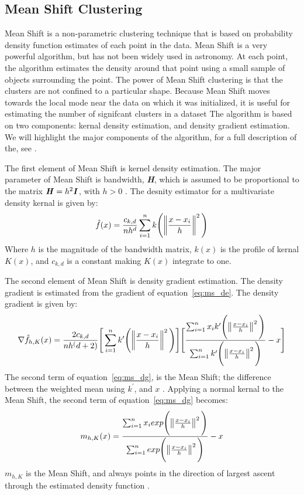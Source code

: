 \subsection{Mean Shift Clustering} 
Mean Shift is a non-parametric clustering technique that is based on probability density function estimates of each point in the data. %
Mean Shift is a very powerful algorithm, but has not been widely used in astronomy. %
At each point, the algorithm estimates the density around that point using a small sample of objects surrounding the point.
The power of Mean Shift clustering is that the clusters are not confined to a particular shape.
Because Mean Shift moves towards the local mode near the data on which it was initialized, it is useful for estimating the number of signifcant clusters in a dataset \citet{comanciciu02}
The algorithm is based on two components: kernal density estimation, and density gradient estimation.
We will highlight the major components of the algorithm, for a full description of the, see \citet{vatturi09}.

The first element of Mean Shift is kernel density estimation. 
The major parameter of Mean Shift is bandwidth, \textbf{\textit{H}}, which is assumed to be proportional to the matrix $\textbf{\textit{H}} = h^2\textbf{\textit{I}}$, with $h>0$ \citet{vatturi09}.
The desnity estimator for a multivariate density kernal is given by: 
\begin{equation} 
\label{eq:ms_de}
\hat{f}(x) = \frac{c_{k,d}}{nh^d} \sum_{i=1}^n k\Bigg( \norm{\frac{x-x_{i}}{h}}^2 \Bigg)
\end{equation}
Where $h$ is the magnitude of the bandwidth matrix, $k(x)$ is the profile of kernal $K(x)$, and $c_{k,d}$ is a constant making $K(x)$ integrate to one\citet{vatturi09}.

The second element of Mean Shift is density gradient estimation. 
The density gradient is estimated from the gradient of equation~\ref{eq:ms_de}\citet{vatturi09}.
The density gradient is given by: 
\begin{equation}
\label{eq:ms_dg}
\nabla\hat{f}_{h,K}(x) = \frac{2c_{k,d}}{nh^(d+2)} \Bigg[ \sum_{i=1}^n k^{\prime} \Bigg( \norm{\frac{x-x_{i}}{h}}^2 \Bigg) \Bigg] \Bigg[\frac{\sum_{i=1}^n x_{i}k^{\prime} \Bigg( \norm{\frac{x-x_{i}}{h}}^2 \Bigg)}{\sum_{i=1}^n k^{\prime} \Bigg( \norm{\frac{x-x_{i}}{h}}^2 \Bigg)} - x \Bigg]
\end{equation}
The second term of equation~\ref{eq:ms_dg}, is the Mean Shift; the difference between the weighted mean using $k^{\prime}$, and $x$ \citet{vatturi09}.
Applying a normal kernal to the Mean Shift, the second term of equation~\ref{eq:ms_dg} becomes: 
\begin{equation} 
\label{eq:ms_sh}
m_{h,K}(x) = \frac{\sum_{i=1}^n x_{i} exp \Bigg(\norm{\frac{x-x_{i}}{h}}^2 \Bigg)}{\sum_{i=1}^n exp \Bigg(\norm{\frac{x-x_{i}}{h}}^2 \Bigg)} - x
\end{equation}
$m_{h,K}$ is the Mean Shift, and always points in the direction of largest ascent through the estimated density function \citet{vatturi09}.

